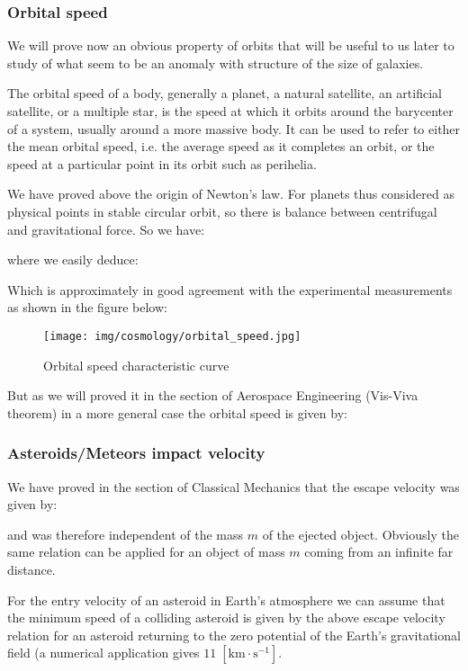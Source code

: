 	\subsubsection{Orbital speed}
	We will prove now an obvious property of orbits that will be useful to us later to study of what seem to be an anomaly with structure of the size of galaxies.
	
	The orbital speed of a body, generally a planet, a natural satellite, an artificial satellite, or a multiple star, is the speed at which it orbits around the barycenter of a system, usually around a more massive body. It can be used to refer to either the mean orbital speed, i.e. the average speed as it completes an orbit, or the speed at a particular point in its orbit such as perihelia.
	
	We have proved above the origin of Newton's law. For planets thus considered as physical points in stable circular orbit, so there is balance between centrifugal and gravitational force. So we have:
	
	where we easily deduce:
	
	Which is approximately in good agreement with the experimental measurements as shown in the figure below:
	\begin{figure}[H]
		\begin{center}
		\texttt{[image: img/cosmology/orbital\_speed.jpg]}
		\end{center}	
		\caption{Orbital speed characteristic curve}
	\end{figure}
	But as we will proved it in the section of Aerospace Engineering (Vis-Viva theorem) in a more general case the orbital speed is given by:
	
	
	\subsubsection{Asteroids/Meteors impact velocity}
	We have proved in the section of Classical Mechanics that the escape velocity was given by:
	
	and was therefore independent of the mass $m$ of the ejected object. Obviously the same relation can be applied for an object of mass $m$ coming from an infinite far distance.
	
	For the entry velocity of an asteroid in Earth's atmosphere we can assume that the minimum speed of a colliding asteroid is given by the above escape velocity relation for an asteroid returning to the zero potential of the Earth's gravitational field (a numerical application gives ${11 \;[\text{km}\cdot \text{s}^{-1}]}$.


